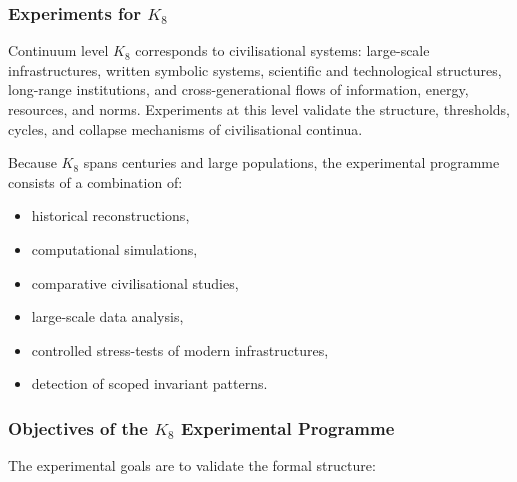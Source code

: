 
\subsubsection{Experiments for \texorpdfstring{$K_8$}{K_8}}
\label{sec:experiments-k8}

Continuum level $K_8$ corresponds to civilisational systems:
large-scale infrastructures, written symbolic systems, scientific
and technological structures, long-range institutions, and
cross-generational flows of information, energy, resources, and norms.
Experiments at this level validate the structure, thresholds,
cycles, and collapse mechanisms of civilisational continua.

Because $K_8$ spans centuries and large populations, the
experimental programme consists of a combination of:
\begin{itemize}
    \item historical reconstructions,
    \item computational simulations,
    \item comparative civilisational studies,
    \item large-scale data analysis,
    \item controlled stress-tests of modern infrastructures,
    \item detection of scoped invariant patterns.
\end{itemize}



\subsubsection{Objectives of the \texorpdfstring{$K_8$}{K_8} Experimental Programme}

The experimental goals are to validate the formal structure:

